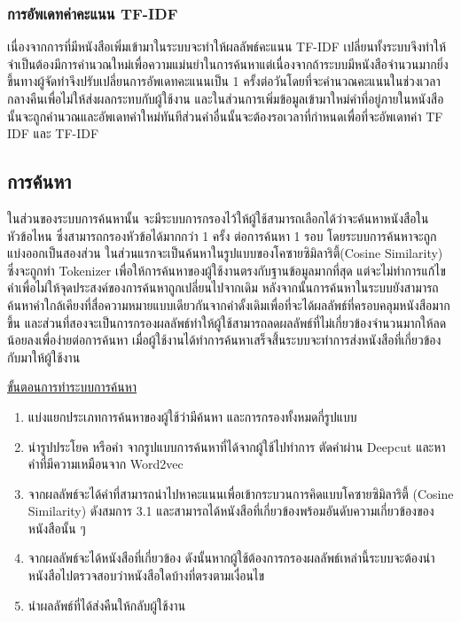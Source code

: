 \subsubsection{การอัพเดทค่าคะแนน TF-IDF}

เนื่องจากการที่มีหนังสือเพิ่มเข้ามาในระบบจะทำให้ผลลัพธ์คะแนน TF-IDF เปลี่ยนทั้งระบบจึงทำให้จำเป็นต้องมีการคำนวณใหม่เพื่อความแม่นยำในการค้นหาแต่เนื่องจากถ้าระบบมีหนังสือจำนวนมากยิ่งขึ้นทางผู้จัดทำจึงปรับเปลี่ยนการอัพเดทคะแนนเป็น 1 ครั้งต่อวันโดยที่จะคำนวณคะแนนในช่วงเวลากลางคืนเพื่อไม่ให้ส่งผลกระทบกับผู้ใช้งาน และในส่วนการเพิ่มข้อมูลเข้ามาใหม่คำที่อยู่ภายในหนังสือนั้นจะถูกคำนวณและอัพเดทค่าใหม่ทันทีส่วนคำอื่นนั้นจะต้องรอเวลาที่กำหนดเพื่อที่จะอัพเดทค่า TF IDF และ TF-IDF 

\subsection{การค้นหา}

ในส่วนของระบบการค้นหานั้น จะมีระบบการกรองไว้ให้ผู้ใช้สามารถเลือกได้ว่าจะค้นหาหนังสือในหัวข้อไหน ซึ่งสามารถกรองหัวข้อได้มากกว่า 1 ครั้ง ต่อการค้นหา 1 รอบ โดยระบบการค้นหาจะถูกแบ่งออกเป็นสองส่วน ในส่วนแรกจะเป็นค้นหาในรูปแบบของโคซายซิมิลาริตี้(Cosine Similarity) ซึ่งจะถูกทำ  Tokenizer เพื่อให้การค้นหาของผู้ใช้งานตรงกับฐานข้อมูลมากที่สุด แต่จะไม่ทำการแก้ไขคำเพื่อไม่ให้จุดประสงค์ของการค้นหาถูกเปลี่ยนไปจากเดิม หลังจากนั้นการค้นหาในระบบยังสามารถค้นหาคำใกล้เคียงที่สื่อความหมายแบบเดียวกันจากคำดั้งเดิมเพื่อที่จะได้ผลลัพธ์ที่ครอบคลุมหนังสือมากขึ้น และส่วนที่สองจะเป็นการกรองผลลัพธ์ทำให้ผู้ใช้สามารถลดผลลัพธ์ที่ไม่เกี่ยวข้องจำนวนมากให้ลดน้อยลงเพื่อง่ายต่อการค้นหา เมื่อผู้ใช้งานได้ทำการค้นหาเสร็จสิ้่นระบบจะทำการส่งหนังสือที่เกี่ยวข้องกับมาให้ผู้ใช้งาน

\underline{ขั้นตอนการทำระบบการค้นหา}

\begin{enumerate}
    \item แบ่งแยกประเภทการค้นหาของผู้ใช้ว่ามีค้นหา และการกรองทั้งหมดกี่รูปแบบ
    \item นำรูปประโยค หรือคำ จากรูปแบบการค้นหาที่ได้จากผู้ใช้ไปทำการ ตัดคำผ่าน Deepcut และหาคำที่มีความเหมือนจาก Word2vec
    \item จากผลลัพธ์จะได้คำที่สามารถนำไปหาคะแนนเพื่อเข้ากระบวนการคิดแบบโคซายซิมิลาริตี้ (Cosine Similarity) ดังสมการ 3.1 และสามารถได้หนังสือที่เกี่ยวข้องพร้อมอันดับความเกี่ยวข้องของหนังสือนั้น ๆ
    \item จากผลลัพธ์จะได้หนังสือที่เกี่ยวข้อง ดังนั้นหากผู้ใช้ต้องการกรองผลลัพธ์เหล่านี้ระบบจะต้องนำหนังสือไปตรวจสอบว่าหนังสือใดบ้างที่ตรงตามเงื่อนไข
    \item นำผลลัพธ์ที่ได้ส่งคืนให้กลับผู้ใช้งาน

\end{enumerate}


